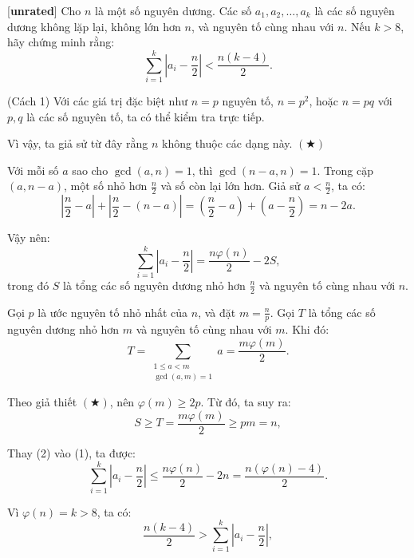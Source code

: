 \documentclass[../01-divisibility.tex]{subfiles}
\begin{document}
\begin{example*}\label{example:KOR-2015-MO-P8}[\textbf{unrated}]
	Cho \( n \) là một số nguyên dương. Các số \( a_1, a_2, \dots, a_k \) là các số nguyên dương không lặp lại, không lớn hơn \( n \),
	và nguyên tố cùng nhau với \( n \). Nếu \( k > 8 \), hãy chứng minh rằng:
	\[
		\sum_{i=1}^k \left| a_i - \frac{n}{2} \right| < \frac{n(k - 4)}{2}.
	\]
\end{example*}

\begin{soln}(Cách 1)\footnotemark
	Với các giá trị đặc biệt như \( n = p \) nguyên tố, \( n = p^2 \), hoặc \( n = pq \) với \( p, q \) là các số nguyên tố, ta có thể kiểm tra trực tiếp.
	
	Vì vậy, ta giả sử từ đây rằng \( n \) không thuộc các dạng này. $(\bigstar)$

	Với mỗi số \( a \) sao cho \( \gcd(a, n) = 1 \), thì \( \gcd(n - a, n) = 1 \). Trong cặp \( (a, n - a) \), một số nhỏ hơn \( \frac{n}{2} \) và số còn lại lớn hơn.
	Giả sử \( a < \frac{n}{2} \), ta có:
	\[
		\left| \frac{n}{2} - a \right| + \left| \frac{n}{2} - (n - a) \right| = \left( \frac{n}{2} - a \right) + \left( a - \frac{n}{2} \right) = n - 2a.
	\]

	Vậy nên:
	\[
		\sum_{i=1}^k \left| a_i - \frac{n}{2} \right| = \frac{n\varphi(n)}{2} - 2S, \tag{1}
	\]
	trong đó \( S \) là tổng các số nguyên dương nhỏ hơn \( \frac{n}{2} \) và nguyên tố cùng nhau với \( n \).

	Gọi \( p \) là ước nguyên tố nhỏ nhất của \( n \), và đặt \( m = \frac{n}{p} \).
	Gọi \( T \) là tổng các số nguyên dương nhỏ hơn \( m \) và nguyên tố cùng nhau với \( m \). Khi đó:
	\[
		T = \sum_{\substack{1 \le a < m \\ \gcd(a, m) = 1}} a = \frac{m\varphi(m)}{2}.
	\]

	Theo giả thiết \( (\bigstar) \), nên \( \varphi(m) \ge 2p \). Từ đó, ta suy ra:
	\[
		S \ge T = \frac{m\varphi(m)}{2} \ge p m = n, \tag{2}
	\]


	Thay (2) vào (1), ta được:
	\[
		\sum_{i=1}^k \left| a_i - \frac{n}{2} \right| \le \frac{n\varphi(n)}{2} - 2n = \frac{n(\varphi(n) - 4)}{2}.
	\]
	
	Vì \( \varphi(n) = k > 8 \), ta có:
	\[
		\frac{n(k - 4)}{2} > \sum_{i=1}^k \left| a_i - \frac{n}{2} \right|,
	\]
\end{soln}

\end{document}
